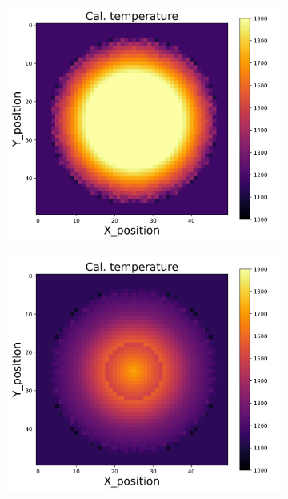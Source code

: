 {\begin{figure}[p]
\begin{minipage}{\textwidth}
\begin{subfigure}{0.325\textwidth}
        \end{subfigure}
    \end{minipage}\\
    \begin{minipage}{\textwidth}
        \centering
        \begin{subfigure}{0.325\textwidth}
            \centering
            \includegraphics[width=\textwidth]{figures/raw_data/32/mix/T_cal.jpg}
        \end{subfigure}
        \begin{subfigure}{0.325\textwidth}
            \centering
            \includegraphics[width=\textwidth]{figures/raw_data/33/mix/T_cal.jpg}

\end{subfigure}
\end{minipage}
\end{figure}}
